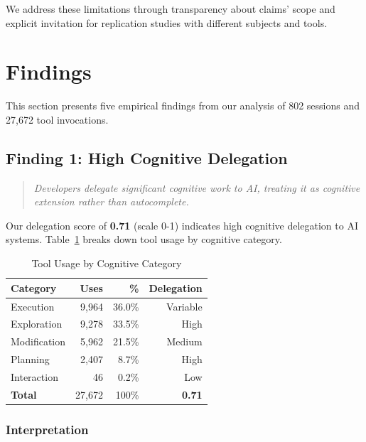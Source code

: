 \documentclass{ntlabs-preprint}
\begin{document}
We address these limitations through transparency about claims' scope and explicit invitation for replication studies with different subjects and tools.

\section{Findings}

This section presents five empirical findings from our analysis of 802 sessions and 27,672 tool invocations.

\subsection{Finding 1: High Cognitive Delegation}

\begin{quote}
\textit{Developers delegate significant cognitive work to AI, treating it as cognitive extension rather than autocomplete.}
\end{quote}

Our delegation score of \textbf{0.71} (scale 0-1) indicates high cognitive delegation to AI systems. Table~\ref{tab:delegation} breaks down tool usage by cognitive category.

\begin{table}[h]
\centering
\caption{Tool Usage by Cognitive Category}
\label{tab:delegation}
\begin{tabular}{lrrr}
\toprule
\textbf{Category} & \textbf{Uses} & \textbf{\%} & \textbf{Delegation} \\
\midrule
Execution & 9,964 & 36.0\% & Variable \\
Exploration & 9,278 & 33.5\% & High \\
Modification & 5,962 & 21.5\% & Medium \\
Planning & 2,407 & 8.7\% & High \\
Interaction & 46 & 0.2\% & Low \\
\midrule
\textbf{Total} & 27,672 & 100\% & \textbf{0.71} \\
\bottomrule
\end{tabular}
\end{table}

\subsubsection{Interpretation}
\end{document}
